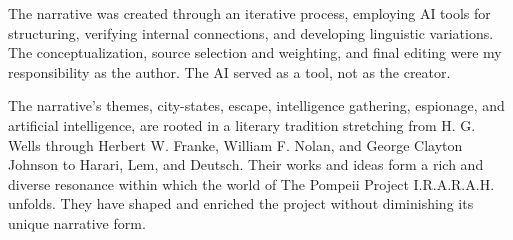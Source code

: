 \documentclass[
]{article}
\begin{document}
The narrative was created through an iterative process, employing AI tools for structuring, verifying internal connections, and developing linguistic variations. The conceptualization, source selection and weighting, and final editing were my responsibility as the author. The AI ​​served as a tool, not as the creator.

The narrative's themes, city-states, escape, intelligence gathering, espionage, and artificial intelligence, are rooted in a literary tradition stretching from H. G. Wells through Herbert W. Franke, William F. Nolan, and George Clayton Johnson to Harari, Lem, and Deutsch. Their works and ideas form a rich and diverse resonance within which the world of The Pompeii Project I.R.A.R.A.H. unfolds. They have shaped and enriched the project without diminishing its unique narrative form.
\end{document}
